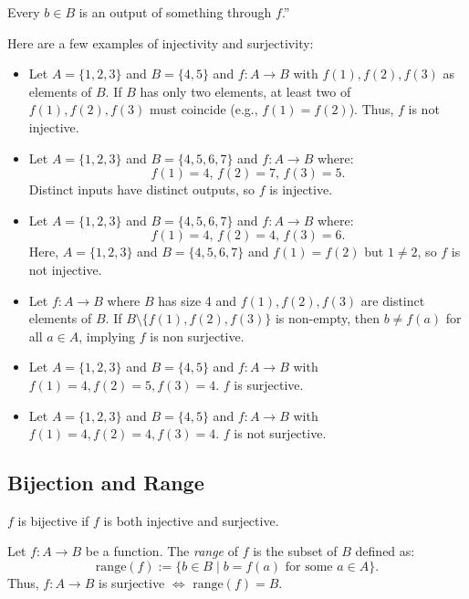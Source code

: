 \documentclass[11pt, draft]{article}
\begin{document}
\begin{fact}
    Every $b \in B$ is an output of something through $f$.''

\end{fact}

\begin{example}
    Here are a few examples of injectivity and surjectivity:
    \begin{itemize}

        \item Let $A = \{1, 2, 3\}$ and $B = \{4, 5\}$ and $f: A \to B$ with $f(1), f(2),
                  f(3)$ as elements of $B$. If $B$ has only two elements, at least two of $f(1),
                  f(2), f(3)$ must coincide (e.g., $f(1) = f(2)$). Thus, $f$ is not injective.
        \item Let $A = \{1, 2, 3\}$ and $B = \{4, 5, 6, 7\}$ and $f : A \to B$ where:
              \[
                  f(1) = 4, \, f(2) = 7, \, f(3) = 5.
              \]
              Distinct inputs have distinct outputs, so $f$ is injective.
        \item Let $A = \{1, 2, 3\}$ and $B = \{4, 5, 6, 7\}$ and $f : A \to B$ where:
              \[
                  f(1) = 4, \, f(2) = 4, \, f(3) = 6.
              \]
              Here, $A = \{1, 2, 3\}$ and $B = \{4, 5, 6, 7\}$ and $f(1) = f(2)$ but $1 \neq
                  2$, so $f$ is not injective.
        \item Let $f : A \to B$ where $B$ has size 4 and $f(1), f(2), f(3)$ are distinct
              elements of $B$. If $B \setminus \{f(1), f(2), f(3)\}$ is non-empty, then $b
                  \neq f(a)$ for all \(a \in A\), implying \(f\) is non surjective.
        \item Let $A = \{1, 2, 3\}$ and $B = \{4, 5\}$ and $f: A \to B$ with $f(1) = 4, f(2)
                  = 5, f(3) = 4$. $f$ is surjective.
        \item Let $A = \{1, 2, 3\}$ and $B = \{4, 5\}$ and $f: A \to B$ with $f(1) = 4, f(2)
                  = 4, f(3) = 4$. $f$ is not surjective.
    \end{itemize}
\end{example}

\subsection{Bijection and Range}
\begin{definition} [Bijectivity]

    $f$ is bijective if $f$ is both injective and surjective.
\end{definition}
\begin{definition}

    Let $f : A \to B$ be a function. The \textit{range} of $f$ is the subset of $B$
    defined as:
    \[
        \text{range}(f) := \{ b \in B \mid b = f(a) \text{ for some } a \in A \}.
    \]
    Thus, $f : A \to B$ is surjective \(\Longleftrightarrow\) $\text{range}(f) =
        B$.
\end{definition}
\end{document}

